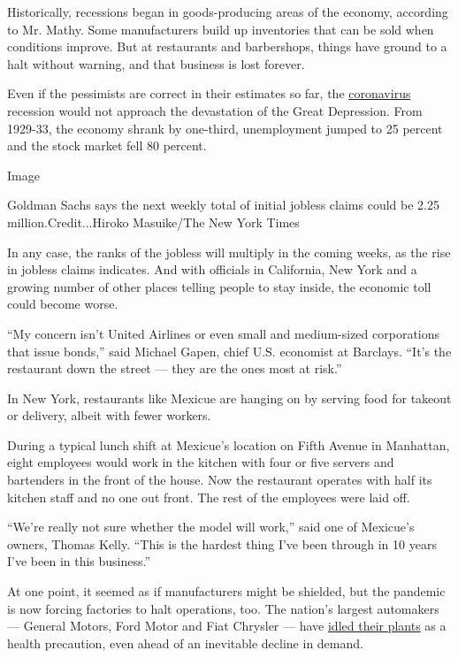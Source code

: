 Historically, recessions began in goods-producing areas of the economy,
according to Mr. Mathy. Some manufacturers build up inventories that can
be sold when conditions improve. But at restaurants and barbershops,
things have ground to a halt without warning, and that business is lost
forever.

Even if the pessimists are correct in their estimates so far, the
\href{https://www.nytimes3xbfgragh.onion/2020/04/13/business/coronavirus-economy.html}{coronavirus}
recession would not approach the devastation of the Great Depression.
From 1929-33, the economy shrank by one-third, unemployment jumped to 25
percent and the stock market fell 80 percent.

Image

Goldman Sachs says the next weekly total of initial jobless claims could
be 2.25 million.Credit...Hiroko Masuike/The New York Times

In any case, the ranks of the jobless will multiply in the coming weeks,
as the rise in jobless claims indicates. And with officials in
California, New York and a growing number of other places telling people
to stay inside, the economic toll could become worse.

``My concern isn't United Airlines or even small and medium-sized
corporations that issue bonds,'' said Michael Gapen, chief U.S.
economist at Barclays. ``It's the restaurant down the street --- they
are the ones most at risk.''

In New York, restaurants like Mexicue are hanging on by serving food for
takeout or delivery, albeit with fewer workers.

During a typical lunch shift at Mexicue's location on Fifth Avenue in
Manhattan, eight employees would work in the kitchen with four or five
servers and bartenders in the front of the house. Now the restaurant
operates with half its kitchen staff and no one out front. The rest of
the employees were laid off.

``We're really not sure whether the model will work,'' said one of
Mexicue's owners, Thomas Kelly. ``This is the hardest thing I've been
through in 10 years I've been in this business.''

At one point, it seemed as if manufacturers might be shielded, but the
pandemic is now forcing factories to halt operations, too. The nation's
largest automakers --- General Motors, Ford Motor and Fiat Chrysler ---
have
\href{https://www.nytimes3xbfgragh.onion/2020/03/18/business/economy/gm-ford-fiatchrysler-factories-virus.html}{idled
their plants} as a health precaution, even ahead of an inevitable
decline in demand.

